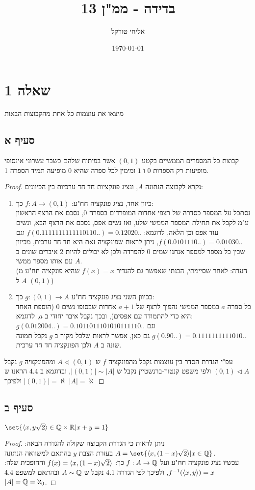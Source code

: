 \documentclass{article}
\title{בדידה - ממ"ן 13}
\author{אליחי טורקל \ID}
\date\today
\DeclarePairedDelimiter\set\{\}
\begin{document}
	\maketitle %

	\section*{שאלה 1}
	מיצאו את עוצמות כל אחת מהקבוצות הבאות
	\subsection*{סעיף א}
	קבוצת כל המספרים הממשיים בקטע $(0,1)$ אשר בפיתוח שלהם כשבר עשרוני אינסופי מופיעות רק הספרות $0$ ו $1$ ומימין לכל ספרה שהיא 0 מופיעה תמיד הספרה 1.
	\begin{proof}
		נקרא לקבוצה הנתונה $A$, ונציג פונקציות חד חד ערכיות בין הכיוונים:
		\begin{enumerate}
			\item כיוון אחד, נציג פונקציה חח"ע: $f: A \to (0,1)$ כך: \\
			נסתכל על המספר כסדרה של רצפי אחדות המופרדים בספרה 0, נסכם את הרצף הראשון ע"מ לקבל את תחילת המספר הממשי שלנו, ואז נשים אפס, נסכם את הרצף הבא, ונשים עוד אפס וכן הלאה,
			לדוגמא: $f(0.1111111111110110..) = 0.12020..$ וגם $f(0.0101110..) = 0.01030..$,
			ניתן לראות שפונקציה זאת היא חד חד ערכית, מכיוון שבין כל מספר למספר אנחנו שמים 0 להפרדה ולכן לא יכולים להיות 2 איברים שונים ב $A$ עם אותו מספר ממשי. \\
			(הערה: לאחר שסיימתי, הבנתי שאפשר גם להגדיר $f(x) = x$ שהיא פונקציה חח"ע מ $A$ ל $(0,1)$)
			\item בכיוון השני נציג פונקציה חח"ע $g: (0,1) \to A$ כך:\\
			כל ספרה $a$ במספר הממשי נהפוך לרצף של $a+1$ אחדות שבסופו נשים 0 (הוספת האחד היא כדי להתמודד עם אפסים), ובכך נקבל איבר יחודי ב $a$,
			לדוגמא: \\
			$g(0.012004..) = 0.1011011101010111110..$ וגם $g(0.90..) = 0.1111111111010..$
			גם כאן, אפשר לראות שלכל מקור ב $g$ נקבל תמונה שונה ב $A$ ולכן הפונקציה חד חד ערכית.
		\end{enumerate}
		עפ"י הגדרת הסדר בין עוצמות נקבל מהפונקציה $f$ ש $A \vartriangleleft (0,1)$ ומהפונקציה $g$ נקבל $(0,1) \vartriangleleft A$ ולפי משפט קנטור-ברנשטיין נקבל ש $|(0,1)| \sim |A|$,
		ובדוגמא ב $4.4$ הראנו ש $|(0,1)| = \aleph$ ולפיכך $|A| = \aleph$
	\end{proof}
	\pagebreak
	\subsection*{סעיף ב}
	$\set{\ang{x, y\sqrt{2}} \in \QQ \times \RR | x + y = 1}$
	\begin{proof}
		ניתן לראות כי הגדרת הקבוצה שקולה להגדרה הבאה: $A = \set{\ang{x, (1-x)\sqrt{2}} | x \in \QQ}$ בעזרת הצבת $y$ בהתאם למשוואה הנתונה. \\
		עכשיו נציג פונקציה חח"ע ועל $f: A \to \mathbb{Q}$ כך: $f(x) = \langle x, (1-x)\sqrt{2} \rangle$ וההופכית שלה: $f^{-1}(\langle x,y \rangle) = x$,
		ולפיכך לפי הגדרה 4.1 נקבל ש $A \sim \mathbb{Q}$ ובהתאם למשפט 4.4 $|A| = \mathbb{Q} = \aleph_0$.
	\end{proof}
\end{document}

